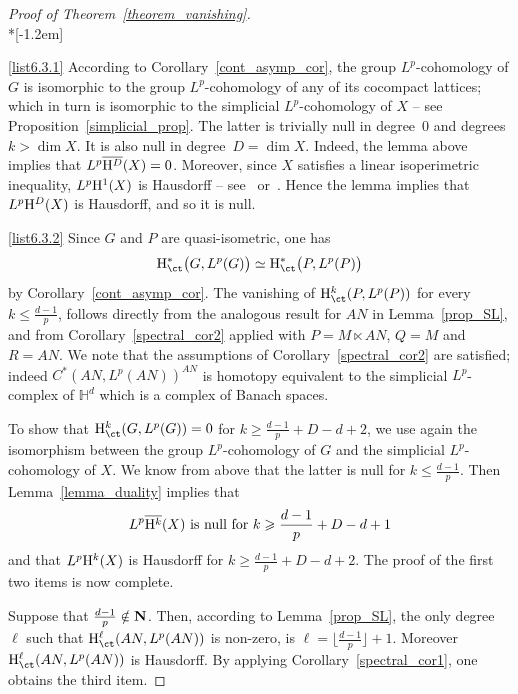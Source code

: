 \begin{proof}[Proof of Theorem~\ref{theorem_vanishing}]\ \\*[-1.2em]

\eqref{list6.3.1} According to Corollary~\ref{cont_asymp_cor}, the group $L^p$-cohomology of $G$ is isomorphic to the group $L^p$-cohomology of any of its cocompact lattices; which in turn is isomorphic to the simplicial $L^p$-cohomology of $X$ -- see Proposition~\ref{simplicial_prop}. The latter is trivially null in degree~$0$ and degrees $k > \dim X$. It is also null in degree~$D = \dim X$. Indeed, the lemma above implies that $L^p \overline{{\rm H}^D} (X) = 0$. Moreover, since $X$ satisfies a linear isoperimetric inequality, $L^p {\rm H}^1 (X)$ is Hausdorff -- see~\cite{P2} or~\cite{G}. Hence the lemma implies that $L^p {\rm H}^D (X)$ is Hausdorff, and so it is null.

\eqref{list6.3.2} Since $G$ and $P$ are quasi-isometric, one has
\[{\rm H}^* _{\ct}\bigl(G, L^p(G) \bigr) \simeq {\rm H}^* _{\ct}\bigl(P, L^p(P)\bigr)
\]
by Corollary~\ref{cont_asymp_cor}. The vanishing of ${\rm H}^k _{\ct}(P, L^p(P))$ for every $k \leqslant \frac{d-1}{p}$, follows directly from the analogous result for $AN$ in Lemma~\ref{prop_SL}, and from Corollary~\ref{spectral_cor2} applied with $P = M \ltimes AN$, $Q = M$ and $R=AN$. We note that the assumptions of Corollary~\ref{spectral_cor2} are satisfied; indeed $C^*(AN, L^p(AN))^{AN}$ is homotopy equivalent to the simplicial $L^p$-complex of $\mathbb H ^d$ which is a complex of Banach spaces.

To show that ${\rm H}^k _{\ct} (G, L^p(G)) = 0$ for $k \geqslant \frac{d-1}{p} +D -d +2$, we use again the isomorphism between the group $L^p$-cohomology of $G$ and the simplicial $L^p$-cohomology of $X$. We know from above that the latter is null for $k \leqslant \frac{d-1}{p}$. Then Lemma~\ref{lemma_duality} implies that
\[
L^p \overline{{\rm H}^k} (X)\text{ is null for }k \geqslant \frac{d-1}{p} +D -d +1
\]
and that $L^p {\rm H}^k (X)$ is Hausdorff for $k \geqslant \frac{d-1}{p} +D -d +2$. The proof of the first two items is now complete.

Suppose that $\frac{d-1}{p} \notin {\bf N}$. Then, according to Lemma~\ref{prop_SL}, the only degree $\ell$ such that ${\rm H}^\ell _{\ct} (AN, L^p(AN))$ is non-zero, is $\ell = \lfloor \frac{d-1}{p} \rfloor +1$. Moreover ${\rm H}^\ell _{\ct} (AN, L^p(AN))$ is Hausdorff. By applying Corollary~\ref{spectral_cor1}, one obtains the third item.
\end{proof}

